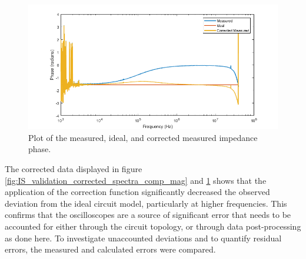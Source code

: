 \begin{figure}[H]
    \centering
    \includegraphics[width=\textwidth]{images/CorrectedImpedancePhase.png}
    \caption{Plot of the measured, ideal, and corrected measured impedance phase.}
    \label{fig:IS_validation_corrected_spectra_comp_phase}
\end{figure}


\par The corrected data displayed in figure \ref{fig:IS_validation_corrected_spectra_comp_mag} and \ref{fig:IS_validation_corrected_spectra_comp_phase} shows that the application of the correction function significantly decreased the observed deviation from the ideal circuit model, particularly at higher frequencies. This confirms that the oscilloscopes are a source of significant error that needs to be accounted for either through the circuit topology, or through data post-processing as done here. To investigate unaccounted deviations and to quantify residual errors, the measured and calculated errors were compared.


